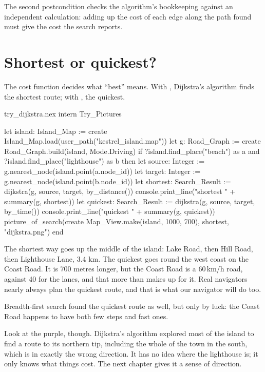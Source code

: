 The second postcondition checks the algorithm's bookkeeping against an
independent calculation: adding up the cost of each edge along the path
found must give the cost the search reports.

\section{Shortest or quickest?}

The cost function decides what ``best'' means. With ,
Dijkstra's algorithm finds the shortest route; with , the
quickest.

\begin{tryit}{try_dijkstra.nex}
intern Try_Pictures

let island: Island_Map := create Island_Map.load(user_path("kestrel_island.map"))
let g: Road_Graph := create Road_Graph.build(island, Mode.Driving)
if ?island.find_place("beach") as a and ?island.find_place("lighthouse") as b then
  let source: Integer := g.nearest_node(island.point(a.node_id))
  let target: Integer := g.nearest_node(island.point(b.node_id))
  let shortest: Search_Result := dijkstra(g, source, target, by_distance())
  console.print_line("shortest  " + summary(g, shortest))
  let quickest: Search_Result := dijkstra(g, source, target, by_time())
  console.print_line("quickest  " + summary(g, quickest))
  picture_of_search(create Map_View.make(island, 1000, 700), shortest, "dijkstra.png")
end
\end{tryit}

The shortest way goes up the middle of the island: Lake Road, then Hill
Road, then Lighthouse Lane, 3.4 km. The quickest goes round the west coast
on the Coast Road. It is 700 metres longer, but the Coast Road is a 60\,km/h
road, against 40 for the lanes, and that more than makes up for it. Real
navigators nearly always plan the quickest route, and that is what our
navigator will do too.

Breadth-first search found the quickest route as well, but only by luck:
the Coast Road happens to have both few steps and fast ones.

Look at the purple, though. Dijkstra's algorithm explored most of
the island to find a route to its northern tip, including the whole of the
town in the south, which is in exactly the wrong direction. It has no
idea where the lighthouse is; it only knows what things cost. The next
chapter gives it a sense of direction.
